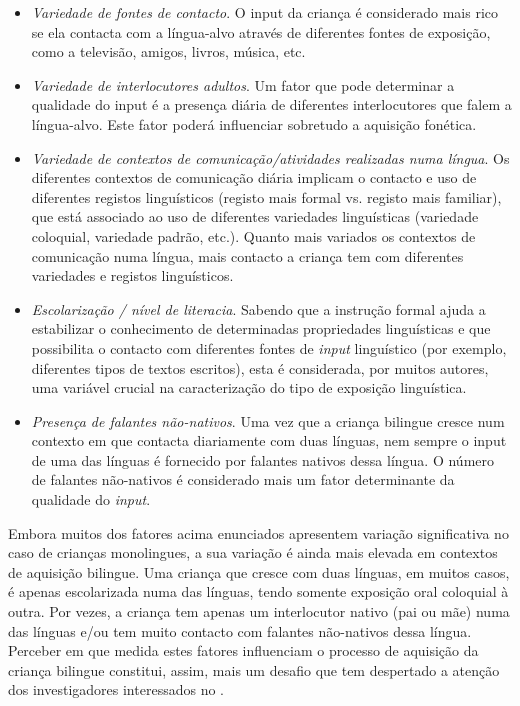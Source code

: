\documentclass[output=paper]{LSP/langsci}
\begin{document}
\begin{itemize}
\item \textit{Variedade de fontes de contacto}. O input da criança é considerado mais rico se ela contacta com a língua-alvo através de diferentes fontes de exposição, como a televisão, amigos, livros, música, etc.
\item \textit{Variedade de interlocutores adultos}. Um fator que pode determinar a qualidade do input é a presença diária de diferentes interlocutores que falem a língua-alvo. Este fator poderá influenciar sobretudo a aquisição fonética.
\item \textit{Variedade de contextos de comunicação/atividades realizadas numa língua}. Os diferentes contextos de comunicação diária implicam o contacto e uso de diferentes registos linguísticos (registo mais formal vs. registo mais familiar), que está associado ao uso de diferentes variedades linguísticas (variedade coloquial, variedade padrão, etc.). Quanto mais variados os contextos de comunicação numa língua, mais contacto a criança tem com diferentes variedades e registos linguísticos. 
\item \textit{Escolarização / nível de literacia}. Sabendo que a instrução formal ajuda a estabilizar o conhecimento de determinadas propriedades linguísticas e que possibilita o contacto com diferentes fontes de \textit{input} linguístico (por exemplo, diferentes tipos de textos escritos), esta é considerada, por muitos autores, uma variável crucial na caracterização do tipo de exposição linguística.
\item \textit{Presença de falantes não-nativos}. Uma vez que a criança bilingue cresce num contexto em que contacta diariamente com duas línguas, nem sempre o input de uma das línguas é fornecido por falantes nativos dessa língua. O número de falantes não-nativos é considerado mais um fator determinante da qualidade do \textit{input}.
\end{itemize}

Embora muitos dos fatores acima enunciados apresentem variação significativa no caso de crianças monolingues, a sua variação é ainda mais elevada em contextos de aquisição bilingue. Uma criança que cresce com duas línguas, em muitos casos, é apenas escolarizada numa das línguas, tendo somente exposição oral coloquial à outra. Por vezes, a criança tem apenas um interlocutor nativo (pai ou mãe) numa das línguas e/ou tem muito contacto com falantes não-nativos dessa língua. Perceber em que medida estes fatores influenciam o processo de aquisição da criança bilingue constitui, assim, mais um desafio que tem despertado a atenção dos investigadores interessados no .
\end{document}
